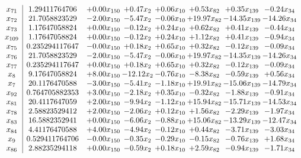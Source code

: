 \documentclass[8pt]{article}
\begin{document}
\[\begin{array}{c| c c@{\hskip 2pt} c@{\hskip 2pt} c@{\hskip 2pt} c@{\hskip 2pt} c@{\hskip 2pt} c@{\hskip 2pt} }
 x_{71}   &  1.29411764706 & +  0.00 x_{150} & +  0.47 x_{2} & +  0.06 x_{10} & +  0.53 x_{82} & +  0.35 x_{139} & -0.24 x_{34}\\
 x_{72}   &  21.7058823529 & -2.00 x_{150} & -5.47 x_{2} & -0.06 x_{10} & + 19.97 x_{82} & -14.35 x_{139} & -14.26 x_{34}\\
 x_{73}   &  1.17647058824 & +  0.00 x_{150} & -0.12 x_{2} & +  0.24 x_{10} & +  0.62 x_{82} & +  0.41 x_{139} & -0.44 x_{34}\\
 x_{109}   &  1.17647058824 & +  0.00 x_{150} & -0.12 x_{2} & +  0.24 x_{10} & +  1.12 x_{82} & +  0.41 x_{139} & -0.94 x_{34}\\
 x_{75}   &  0.235294117647 & -0.00 x_{150} & +  0.18 x_{2} & +  0.65 x_{10} & +  0.32 x_{82} & -0.12 x_{139} & -0.09 x_{34}\\
 x_{76}   &  21.7058823529 & -2.00 x_{150} & -5.47 x_{2} & -0.06 x_{10} & + 19.97 x_{82} & -14.35 x_{139} & -14.26 x_{34}\\
 x_{77}   &  0.235294117647 & +  0.00 x_{150} & +  0.18 x_{2} & +  0.65 x_{10} & +  0.32 x_{82} & -0.12 x_{139} & -0.09 x_{34}\\
 x_{8}   &  9.17647058824 & +  8.00 x_{150} & -12.12 x_{2} & -0.76 x_{10} & -8.38 x_{82} & -0.59 x_{139} & +  0.56 x_{34}\\
 x_{7}   &  20.1176470588 & -3.00 x_{150} & -5.41 x_{2} & -1.18 x_{10} & + 19.91 x_{82} & -15.06 x_{139} & -14.79 x_{34}\\
 x_{92}   &  0.764705882353 & +  3.00 x_{150} & -2.18 x_{2} & +  0.35 x_{10} & -0.32 x_{82} & -1.88 x_{139} & -0.91 x_{34}\\
 x_{81}   &  20.4117647059 & +  2.00 x_{150} & -9.94 x_{2} & -1.12 x_{10} & + 15.94 x_{82} & -15.71 x_{139} & -14.53 x_{34}\\
 x_{78}   &  2.58823529412 & +  2.00 x_{150} & -2.06 x_{2} & +  0.12 x_{10} & +  1.56 x_{82} & -2.29 x_{139} & -1.97 x_{34}\\
 x_{83}   &  16.5882352941 & +  0.00 x_{150} & -6.06 x_{2} & -0.88 x_{10} & + 15.06 x_{82} & -13.29 x_{139} & -12.47 x_{34}\\
 x_{84}   &  4.41176470588 & +  4.00 x_{150} & -4.94 x_{2} & -0.12 x_{10} & +  0.44 x_{82} & -3.71 x_{139} & -3.03 x_{34}\\
 x_{9}   &  0.529411764706 & -0.00 x_{150} & -0.35 x_{2} & -0.29 x_{10} & -0.15 x_{82} & -0.76 x_{139} & +  1.68 x_{34}\\
 x_{86}   &  2.88235294118 & +  0.00 x_{150} & -0.59 x_{2} & +  0.18 x_{10} & +  2.59 x_{82} & -0.94 x_{139} & -1.71 x_{34}\\

\end{array}\]
\end{document}
